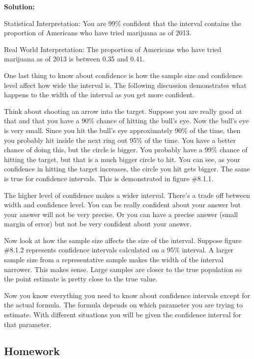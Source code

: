 \documentclass[
]{book}
\begin{document}
\textbf{Solution:}

Statistical Interpretation: You are 99\% confident that the interval contains the proportion of Americans who have tried marijuana as of 2013.

Real World Interpretation: The proportion of Americans who have tried marijuana as of 2013 is between 0.35 and 0.41.

One last thing to know about confidence is how the sample size and confidence level affect how wide the interval is. The following discussion demonstrates what happens to the width of the interval as you get more confident.

Think about shooting an arrow into the target. Suppose you are really good at that and that you have a 90\% chance of hitting the bull's eye. Now the bull's eye is very small. Since you hit the bull's eye
approximately 90\% of the time, then you probably hit inside the next ring out 95\% of the time. You have a better chance of doing this, but the circle is bigger. You probably have a 99\% chance of hitting the target, but that is a much bigger circle to hit. You can see, as your confidence in hitting the target increases, the circle you hit gets bigger. The same is true for confidence intervals. This is demonstrated in figure \#8.1.1.

The higher level of confidence makes a wider interval. There's a trade off between width and confidence level. You can be really confident about your answer but your answer will not be very precise. Or you can have a precise answer (small margin of error) but not be very confident about your answer.

Now look at how the sample size affects the size of the interval. Suppose figure \#8.1.2 represents confidence intervals calculated on a 95\% interval. A larger sample size from a representative sample makes the width of the interval narrower. This makes sense. Large samples are closer to the true population so the point estimate is pretty close to the true value.

Now you know everything you need to know about confidence intervals except for the actual formula. The formula depends on which parameter you are trying to estimate. With different situations you will be given the confidence interval for that parameter.

\hypertarget{homework-19}{%
\subsection{Homework}\label{homework-19}}
\end{document}
